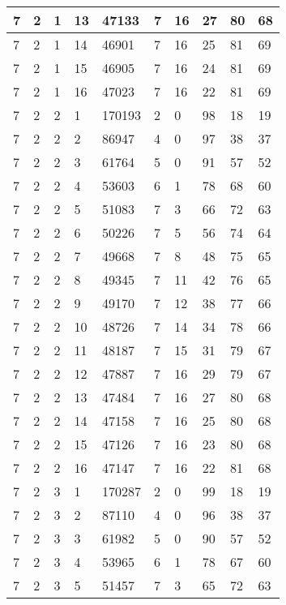 \begin{table}[!ht]
\begin{tabular}{|l|l|l|l|l|l|l|l|l|l|}
        7 & 2 & 1 & 13 & 47133 & 7 & 16 & 27 & 80 & 68 \\ \hline
        7 & 2 & 1 & 14 & 46901 & 7 & 16 & 25 & 81 & 69 \\ \hline
        7 & 2 & 1 & 15 & 46905 & 7 & 16 & 24 & 81 & 69 \\ \hline
        7 & 2 & 1 & 16 & 47023 & 7 & 16 & 22 & 81 & 69 \\ \hline
        7 & 2 & 2 & 1 & 170193 & 2 & 0 & 98 & 18 & 19 \\ \hline
        7 & 2 & 2 & 2 & 86947 & 4 & 0 & 97 & 38 & 37 \\ \hline
        7 & 2 & 2 & 3 & 61764 & 5 & 0 & 91 & 57 & 52 \\ \hline
        7 & 2 & 2 & 4 & 53603 & 6 & 1 & 78 & 68 & 60 \\ \hline
        7 & 2 & 2 & 5 & 51083 & 7 & 3 & 66 & 72 & 63 \\ \hline
        7 & 2 & 2 & 6 & 50226 & 7 & 5 & 56 & 74 & 64 \\ \hline
        7 & 2 & 2 & 7 & 49668 & 7 & 8 & 48 & 75 & 65 \\ \hline
        7 & 2 & 2 & 8 & 49345 & 7 & 11 & 42 & 76 & 65 \\ \hline
        7 & 2 & 2 & 9 & 49170 & 7 & 12 & 38 & 77 & 66 \\ \hline
        7 & 2 & 2 & 10 & 48726 & 7 & 14 & 34 & 78 & 66 \\ \hline
        7 & 2 & 2 & 11 & 48187 & 7 & 15 & 31 & 79 & 67 \\ \hline
        7 & 2 & 2 & 12 & 47887 & 7 & 16 & 29 & 79 & 67 \\ \hline
        7 & 2 & 2 & 13 & 47484 & 7 & 16 & 27 & 80 & 68 \\ \hline
        7 & 2 & 2 & 14 & 47158 & 7 & 16 & 25 & 80 & 68 \\ \hline
        7 & 2 & 2 & 15 & 47126 & 7 & 16 & 23 & 80 & 68 \\ \hline
        7 & 2 & 2 & 16 & 47147 & 7 & 16 & 22 & 81 & 68 \\ \hline
        7 & 2 & 3 & 1 & 170287 & 2 & 0 & 99 & 18 & 19 \\ \hline
        7 & 2 & 3 & 2 & 87110 & 4 & 0 & 96 & 38 & 37 \\ \hline
        7 & 2 & 3 & 3 & 61982 & 5 & 0 & 90 & 57 & 52 \\ \hline
        7 & 2 & 3 & 4 & 53965 & 6 & 1 & 78 & 67 & 60 \\ \hline
        7 & 2 & 3 & 5 & 51457 & 7 & 3 & 65 & 72 & 63 \\ \hline

\end{tabular}
\end{table}
